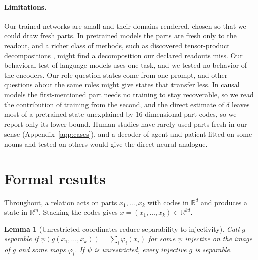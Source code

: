 \documentclass[10pt]{article}
\theoremstyle{plain}
\newtheorem{lemma}{Lemma}
\theoremstyle{remark}
\newcommand{\R}{\mathbb{R}}
\begin{document}
\paragraph{Limitations.} Our trained networks are small and their domains rendered, chosen so that we could draw fresh parts. In pretrained models the parts are fresh only to the readout, and a richer class of methods, such as discovered tensor-product decompositions \citep{soulos2020}, might find a decomposition our declared readouts miss. Our behavioral test of language models uses one task, and we tested no behavior of the encoders. Our role-question states come from one prompt, and other questions about the same roles might give states that transfer less. In causal models the first-mentioned part needs no training to stay recoverable, so we read the contribution of training from the second, and the direct estimate of $\delta$ leaves most of a pretrained state unexplained by 16-dimensional part codes, so we report only its lower bound. Human studies have rarely used parts fresh in our sense (Appendix~\ref{app:cases}), and a decoder of agent and patient \citep{frankland2015} fitted on some nouns and tested on others would give the direct neural analogue.

\FloatBarrier



\clearpage
\appendix
\makeatletter\let\@fb@secFB\relax\makeatother %

\section{Formal results}
\label{app:proofs}

Throughout, a relation acts on parts $x_1, \ldots, x_k$ with codes in $\R^d$ and produces a state in $\R^m$. Stacking the codes gives $x = (x_1, \ldots, x_k) \in \R^{kd}$.



\begin{lemma}[Unrestricted coordinates reduce separability to injectivity]
\label{lem:psi}
Call $g$ separable if $\psi(g(x_1, \ldots, x_k)) = \sum_i \varphi_i(x_i)$ for some $\psi$ injective on the image of $g$ and some maps $\varphi_i$. If $\psi$ is unrestricted, every injective $g$ is separable.
\end{lemma}
\end{document}
